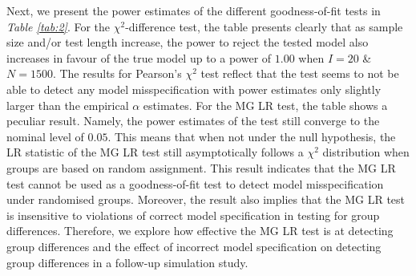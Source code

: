 \documentclass[Royal,sageapa,times,doublespace]{sagej}
\begin{document}
\indent Next, we present the power estimates of the different goodness-of-fit tests in \textit{Table \ref{tab:2}}. For the $\chi^2$-difference test, the table presents clearly that as sample size and/or test length increase, the power to reject the tested model also increases in favour of the true model up to a power of $1.00$ when $I = 20$ \& $N = 1500$. The results for Pearson's $\chi^2$ test reflect that the test seems to not be able to detect any model misspecification with power estimates only slightly larger than the empirical $\alpha$ estimates. For the MG LR test, the table shows a peculiar result. Namely, the power estimates of the test still converge to the nominal level of $0.05$. This means that when not under the null hypothesis, the LR statistic of the MG LR test still asymptotically follows a $\chi^2$ distribution when groups are based on random assignment. This result indicates that the MG LR test cannot be used as a goodness-of-fit test to detect model misspecification under randomised groups. Moreover, the result also implies that the MG LR test is insensitive to violations of correct model specification in testing for group differences. Therefore, we explore how effective the MG LR test is at detecting group differences and the effect of incorrect model specification on detecting group differences in a follow-up simulation study.
\end{document}

